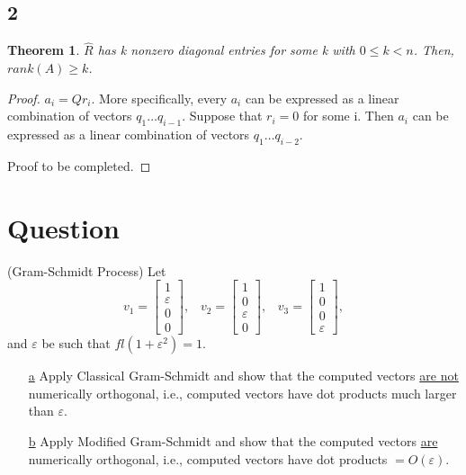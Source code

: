 \documentclass[10pt]{amsart}
\newtheorem{thm}{Theorem}[subsection]
\theoremstyle{remark}
\begin{document}
\subsection{2}
\begin{thm}
$\hat{R}$ has k nonzero diagonal entries for some k with $0\leq k <n$. Then, $rank(A) \geq k$.
\end{thm}
\begin{proof}
$a_{i} = Qr_{i}$. More specifically, every $a_{i}$ can be expressed as a linear combination of vectors $q_{1} \dots q_{i-1}$. Suppose that $r_{i} = 0$ for some i. Then $a_{i}$ can be expressed as a linear combination of vectors $q_{1} \dots q_{i-2}$. 

Proof to be completed.
\end{proof}

\section{Question}
\sf (Gram-Schmidt Process) Let
 \[
  v_{1} = \left[ \begin{array}{c}1 \\ \varepsilon \\ 0 \\ 0 \end{array} \right], \;\;\;
  v_{2} = \left[ \begin{array}{c}1 \\ 0 \\ \varepsilon \\ 0 \end{array} \right], \;\;\;
  v_{3} = \left[ \begin{array}{c}1 \\ 0 \\ 0 \\ \varepsilon \end{array} \right],
 \]
 and $\varepsilon$ be such that $fl(1 + \varepsilon^{2}) = 1$.
 \begin{enumerate}
   \item[\underline{a}] Apply Classical Gram-Schmidt and show that the
   computed vectors \underline{are not} numerically orthogonal, i.e., computed
   vectors have dot products much larger than $\varepsilon$.
   \item[\underline{b}] Apply Modified Gram-Schmidt and show that the
   computed vectors \underline{are} numerically orthogonal, i.e., computed
   vectors have dot products $= O(\varepsilon)$.
 \end{enumerate}
\end{document}

